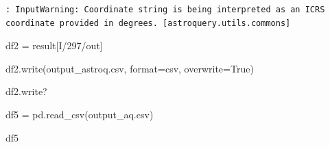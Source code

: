 \documentclass[
  letterpaper,
  DIV=11,
  numbers=noendperiod]{scrreprt}
\newenvironment{Shaded}{\begin{snugshade}}{\end{snugshade}}
\newcommand{\BuiltInTok}[1]{\textcolor[rgb]{0.00,0.23,0.31}{#1}}
\newcommand{\NormalTok}[1]{\textcolor[rgb]{0.00,0.23,0.31}{#1}}
\newcommand{\OperatorTok}[1]{\textcolor[rgb]{0.37,0.37,0.37}{#1}}
\newcommand{\StringTok}[1]{\textcolor[rgb]{0.13,0.47,0.30}{#1}}
\newcommand{\VariableTok}[1]{\textcolor[rgb]{0.07,0.07,0.07}{#1}}
\begin{document}
\begin{verbatim}
: InputWarning: Coordinate string is being interpreted as an ICRS coordinate provided in degrees. [astroquery.utils.commons]
\end{verbatim}

\begin{Shaded}
\begin{Highlighting}[]
\NormalTok{df2 }\OperatorTok{=}\NormalTok{ result[}\StringTok{\textquotesingle{}I/297/out\textquotesingle{}}\NormalTok{]}
\end{Highlighting}
\end{Shaded}

\begin{Shaded}
\begin{Highlighting}[]
\NormalTok{df2.write(}\StringTok{\textquotesingle{}output\_astroq.csv\textquotesingle{}}\NormalTok{, }\BuiltInTok{format}\OperatorTok{=}\StringTok{\textquotesingle{}csv\textquotesingle{}}\NormalTok{, overwrite}\OperatorTok{=}\VariableTok{True}\NormalTok{)}
\end{Highlighting}
\end{Shaded}

\begin{Shaded}
\begin{Highlighting}[]
\NormalTok{df2.write?}
\end{Highlighting}
\end{Shaded}

\begin{Shaded}
\begin{Highlighting}[]
\NormalTok{df5 }\OperatorTok{=}\NormalTok{ pd.read\_csv(}\StringTok{\textquotesingle{}output\_aq.csv\textquotesingle{}}\NormalTok{)}
\end{Highlighting}
\end{Shaded}

\begin{Shaded}
\begin{Highlighting}[]
\NormalTok{df5}
\end{Highlighting}
\end{Shaded}
\end{document}
